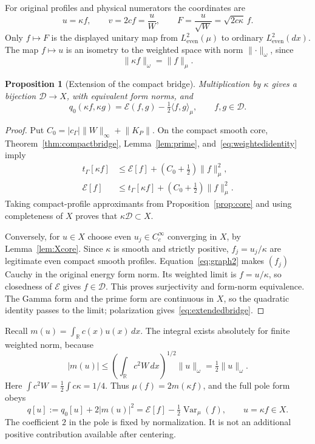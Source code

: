 \documentclass[11pt,a4paper]{article}
\numberwithin{equation}{section}
\newtheorem{proposition}[theorem]{Proposition}
\theoremstyle{definition}
\theoremstyle{remark}
\newcommand{\R}{\mathbb R}
\newcommand{\E}{\mathcal E}
\newcommand{\D}{\mathcal D}
\newcommand{\He}{L^2_{\mathrm{even}}(\mu)}
\newcommand{\Le}{L^2_{\mathrm{even}}(dx)}
\newcommand{\tg}{t_{\Gamma}}
\newcommand{\cg}{c_{\Gamma}}
\newcommand{\Var}{\operatorname{Var}}
\newcommand{\ip}[2]{\langle #1,#2\rangle}
\newcommand{\norm}[1]{\lVert #1\rVert}
\begin{document}
For original profiles and physical numerators the coordinates are
\begin{equation}\label{eq:coordinates}
 u=\kappa f,\qquad v=2cf=\frac uW,\qquad
 F=\frac u{\sqrt W}=\sqrt{2c\kappa}\,f.
\end{equation}
Only $f\mapsto F$ is the displayed unitary map from $\He$ to ordinary $\Le$. The map $f\mapsto u$ is an isometry to the weighted space with norm $\norm{\cdot}_\omega$, since
\begin{equation}\label{eq:weightedidentity}
 \norm{\kappa f}_\omega=\norm{f}_\mu.
\end{equation}

\begin{proposition}[Extension of the compact bridge]\label{prop:domain}
Multiplication by $\kappa$ gives a bijection $\D\to X$, with equivalent form norms, and
\begin{equation}\label{eq:extendedbridge}
 q_0(\kappa f,\kappa g)=\E(f,g)-\tfrac12\ip{f}{g}_\mu,
 \qquad f,g\in\D.
\end{equation}
\end{proposition}
\begin{proof}
Put $C_0=|\cg|\norm{W}_\infty+\norm{K_P}$. On the compact smooth core, Theorem~\ref{thm:compactbridge}, Lemma~\ref{lem:prime}, and~\eqref{eq:weightedidentity} imply
\begin{align}
 \tg[\kappa f]&\le\E[f]+(C_0+\tfrac12)\norm{f}_\mu^2,\label{eq:graph1}\\
 \E[f]&\le\tg[\kappa f]+(C_0+\tfrac12)\norm{f}_\mu^2.\label{eq:graph2}
\end{align}
Taking compact-profile approximants from Proposition~\ref{prop:core} and using completeness of $X$ proves that $\kappa\D\subset X$.

Conversely, for $u\in X$ choose even $u_j\in C_c^\infty$ converging in $X$, by Lemma~\ref{lem:Xcore}. Since $\kappa$ is smooth and strictly positive, $f_j=u_j/\kappa$ are legitimate even compact smooth profiles. Equation~\eqref{eq:graph2} makes $(f_j)$ Cauchy in the original energy form norm. Its weighted limit is $f=u/\kappa$, so closedness of $\E$ gives $f\in\D$. This proves surjectivity and form-norm equivalence. The Gamma form and the prime form are continuous in $X$, so the quadratic identity passes to the limit; polarization gives~\eqref{eq:extendedbridge}.
\end{proof}

Recall $m(u)=\int_\R c(x)u(x)\,dx$. The integral exists absolutely for finite weighted norm, because
\begin{equation}\label{eq:meanbound}
 |m(u)|\le\left(\int_\R c^2W\,dx\right)^{1/2}\norm{u}_\omega
       =\tfrac12\norm{u}_\omega.
\end{equation}
Here $\int c^2W=\tfrac12\int c\kappa=1/4$. Thus $\mu(f)=2m(\kappa f)$, and the full pole form obeys
\begin{equation}\label{eq:polebridge}
 q[u]:=q_0[u]+2|m(u)|^2
       =\E[f]-\tfrac12\Var_\mu(f),\qquad u=\kappa f\in X.
\end{equation}
The coefficient $2$ in the pole is fixed by normalization. It is not an additional positive contribution available after centering.
\end{document}
